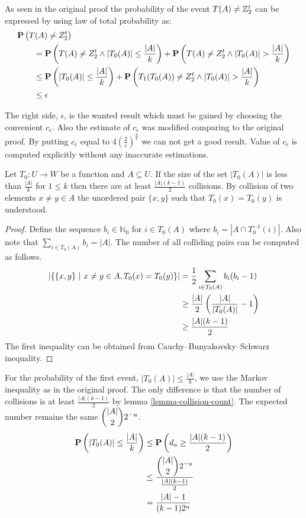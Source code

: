 As seen in the original proof the probability of the event $T(A) \neq \mathbb{Z}_{2}^{t}$ can be expressed by using law of total probability as:
\[
\begin{split}
& \mathbf{P}\left(T(A) \neq Z_2^t\right) \\
    & \qquad = \mathbf{P}\left(T(A) \neq Z_2^t \wedge |T_0(A)| \leq \frac{|A|}{k}\right) + \mathbf{P}\left(T(A) \neq Z_2^t \wedge |T_0(A)| > \frac{|A|}{k}\right) \\ 
    & \qquad \leq \mathbf{P}\left(|T_0(A)| \leq \frac{|A|}{k}\right) + \mathbf{P}\left(T_1(T_0(A)) \neq Z_2^t \wedge |T_0(A)| > \frac{|A|}{k}\right) \\
    & \qquad \leq \epsilon \\
\end{split}
\]

The right side, $\epsilon$, is the wanted result which must be gained by choosing the convenient $c_{\epsilon}$. Also the estimate of $c_{\epsilon}$ was modified comparing to the original proof. By putting $c_{\epsilon}$ equal to $4\left(\frac{2}{\epsilon}\right)^{\frac{8}{\epsilon}}$ we can not get a good result. Value of $c_{\epsilon}$ is computed explicitly without any inaccurate estimations.

\begin{lemma}
\label{lemma-collision-count}
Let $T_0: U \rightarrow W$ be a function and $A \subseteq U$. If the size of the set $|T_0(A)|$ is less than $\frac{|A|}{k}$ for $1 \leq k$ then there are at least $\frac{|A|(k - 1)}{2}$ collisions. By collision of two elements $x \neq y \in A$ the unordered pair $\{ x, y \}$ such that $T_0(x) = T_0(y)$ is understood.
\end{lemma} 
\begin{proof}
Define the sequence $b_i \in \mathbb{N}_0$ for $i \in T_0(A)$ where $b_i = \left|A \cap T_0^{-1}(i)\right|$. Also note that $\sum_{i \in T_0(A)} b_i = |A|$.
The number of all colliding pairs can be computed as follows.
\[
\begin{split}
|\{ \{x, y\} \ | \  x \neq y \in A, T_0(x) = T_0(y) \}| 
	& = \frac{1}{2} \sum_{i \in T_0(A)} b_i (b_i - 1) \\ 
	& \geq \frac{|A|}{2}\left(\frac{|A|}{|T_0(A)|} - 1\right) \\
	& \geq \frac{|A|(k - 1)}{2}
\end{split}
\]
The first inequality can be obtained from Cauchy–Bunyakovsky–Schwarz inequality.
\end{proof}

For the probability of the first event, $|T_0(A)| \leq \frac{|A|}{k}$, we use the Markov inequality as in the original proof. The only difference is that the number of collisions is at least $\frac{|A|(k - 1)}{2}$ by lemma \ref{lemma-collision-count}. The expected number remains the same $\dbinom{|A|}{2}2 ^ {-u}$.
\[
\begin{split}
\mathbf{P}\left(|T_0(A)| \leq \frac{|A|}{k}\right) 
	& \leq \mathbf{P}\left(d_a \geq \frac{|A|(k - 1)}{2}\right) \\
	& \leq \frac{\dbinom{|A|}{2}2 ^ {-u}}{\frac{|A|(k - 1)}{2}} \\
	& = \frac{|A| - 1}{(k - 1) 2^u} \\
\end{split}
\]

